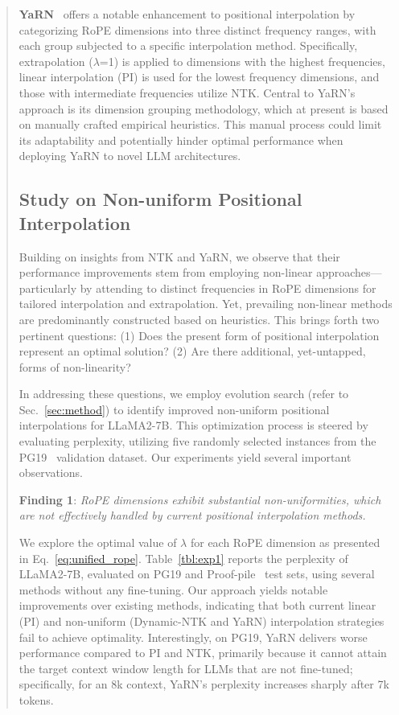 \begin{abstract}
\textbf{YaRN}~\cite{yarn} offers a notable enhancement to positional interpolation by categorizing RoPE dimensions into three distinct frequency ranges, with each group subjected to a specific interpolation method. Specifically, extrapolation ($\lambda$=1) is applied to dimensions with the highest frequencies, linear interpolation (PI) is used for the lowest frequency dimensions, and those with intermediate frequencies utilize NTK. Central to YaRN’s approach is its dimension grouping methodology, which at present is based on manually crafted empirical heuristics. This manual process could limit its adaptability and potentially hinder optimal performance when deploying YaRN to novel LLM architectures.

\subsection{Study on Non-uniform Positional Interpolation}

Building on insights from NTK and YaRN, we observe that their performance improvements stem from employing non-linear approaches—particularly by attending to distinct frequencies in RoPE dimensions for tailored interpolation and extrapolation. Yet, prevailing non-linear methods are predominantly constructed based on heuristics. This brings forth two pertinent questions: (1) Does the present form of positional interpolation represent an optimal solution? (2) Are there additional, yet-untapped, forms of non-linearity?

In addressing these questions, we employ evolution search (refer to Sec.~\ref{sec:method}) to identify improved non-uniform positional interpolations for LLaMA2-7B. This optimization process is steered by evaluating perplexity, utilizing five randomly selected instances from the PG19~\cite{pg19} validation dataset. Our experiments yield several important observations.

\textbf{Finding 1}: \textit{RoPE dimensions exhibit substantial non-uniformities, which are not effectively handled by current positional interpolation methods.}

We explore the optimal value of $\lambda$ for each RoPE dimension as presented in Eq.~\ref{eq:unified_rope}. Table~\ref{tbl:exp1} reports the perplexity of LLaMA2-7B, evaluated on PG19 and Proof-pile~\cite{proof-pile} test sets, using several methods without any fine-tuning. Our approach yields notable improvements over existing methods, indicating that both current linear (PI) and non-uniform (Dynamic-NTK and YaRN) interpolation strategies fail to achieve optimality. Interestingly, on PG19, YaRN delivers worse performance compared to PI and NTK, primarily because it cannot attain the target context window length for LLMs that are not fine-tuned; specifically, for an 8k context, YaRN’s perplexity increases sharply after 7k tokens.


\end{abstract}
